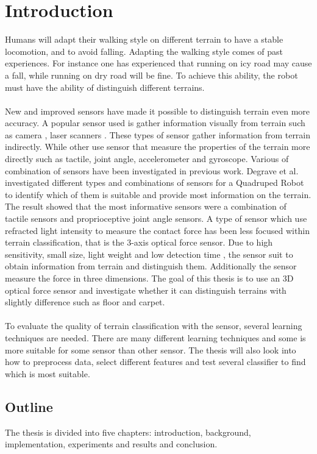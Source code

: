 \documentclass[USenglish]{ifimaster}  %
\begin{document}
\chapter{Introduction}                  %
Humans will adapt their walking style on different terrain to have a stable locomotion, and to avoid falling. Adapting the walking style comes of past experiences. For instance one has experienced that running on icy road may cause a fall, while running on dry road will be fine. To achieve this ability, the robot must have the ability of distinguish different terrains.
\\
\\ 
New and improved sensors have made it possible to distinguish terrain even more accuracy. A popular sensor used is gather information visually from terrain such as camera \cite{littleDog}, laser scanners \cite{4651026}. These types of sensor gather information from terrain indirectly. While other use sensor that measure the properties of the terrain more directly such as tactile, joint angle, accelerometer and gyroscope. Various of combination of sensors have been investigated in previous work. Degrave et al.\cite{6784609} investigated different types and combinations of sensors for a Quadruped Robot to identify which of them is suitable and provide most information on the terrain. The result showed that the most informative sensors were a combination of tactile sensors and proprioceptive joint angle sensors. A type of sensor which use refracted light intensity to measure the contact force has been less focused within terrain classification, that is the 3-axis optical force sensor. Due to high sensitivity, small size, light weight and low detection time \cite{Dutta2016}, the sensor suit to obtain information from terrain and distinguish them. Additionally the sensor measure the force in three dimensions. The goal of this thesis is to use an 3D optical force sensor and investigate whether it can distinguish terrains with slightly difference such as floor and carpet.
\\
\\
To evaluate the quality of terrain classification with the sensor, several learning techniques are needed. There are many different learning techniques and some is more suitable for some sensor than other sensor. The thesis will also look into how to preprocess data, select different features and test several classifier to find which is most suitable.


\section{Outline}
The thesis is divided into five chapters: introduction, background, implementation,  experiments and results and conclusion. 
\end{document}
